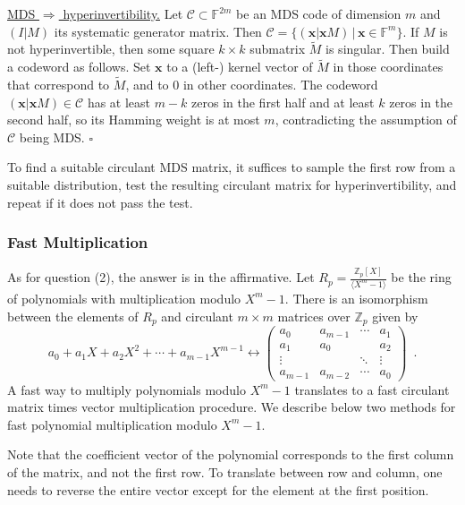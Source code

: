 \documentclass[a4paper]{article}
\begin{document}
\underline{MDS $\Rightarrow$ hyperinvertibility.} Let $\mathcal{C} \subset \mathbb{F}^{2m}$ be an MDS code of dimension $m$ and $(I \vert M)$ its systematic generator matrix. Then $\mathcal{C} = \{ (\mathbf{x} \vert \mathbf{x} M) \, \vert \, \mathbf{x} \in \mathbb{F}^m \}$. If $M$ is not hyperinvertible, then some square $k \times k$ submatrix $\tilde{M}$ is singular. Then build a codeword as follows. Set $\mathbf{x}$ to a (left-) kernel vector of $\tilde{M}$ in those coordinates that correspond to $\tilde{M}$, and to 0 in other coordinates. The codeword $(\mathbf{x} \vert \mathbf{x} M) \in \mathcal{C}$ has at least $m-k$ zeros in the first half and at least $k$ zeros in the second half, so its Hamming weight is at most $m$, contradicting the assumption of $\mathcal{C}$ being MDS. \hfill $\square$

To find a suitable circulant MDS matrix, it suffices to sample the first row from a suitable distribution, test the resulting circulant matrix for hyperinvertibility, and repeat if it does not pass the test.

\subsubsection{Fast Multiplication}

As for question (2), the answer is in the affirmative. Let $R_p = \frac{\mathbb{Z}_p[X]}{\langle X^m - 1\rangle}$ be the ring of polynomials with multiplication modulo $X^m - 1$. There is an isomorphism between the elements of $R_p$ and circulant $m \times m$ matrices over $\mathbb{Z}_p$ given by
\begin{equation}
a_0 + a_1 X + a_2 X^2 + \cdots + a_{m-1} X^{m-1} \leftrightarrow \left( \begin{matrix}
a_0 & a_{m-1} & \cdots & a_1 \\
a_1 & a_0 & & a_2 \\
\vdots & & \ddots & \vdots \\
a_{m-1} & a_{m-2} & \cdots & a_0
\end{matrix} \right) \enspace .
\end{equation}
A fast way to multiply polynomials modulo $X^m - 1$ translates to a fast circulant matrix times vector multiplication procedure. We describe below two methods for fast polynomial multiplication modulo $X^m - 1$.

Note that the coefficient vector of the polynomial corresponds to the first column of the matrix, and not the first row. To translate between row and column, one needs to reverse the entire vector except for the element at the first position.
\end{document}
